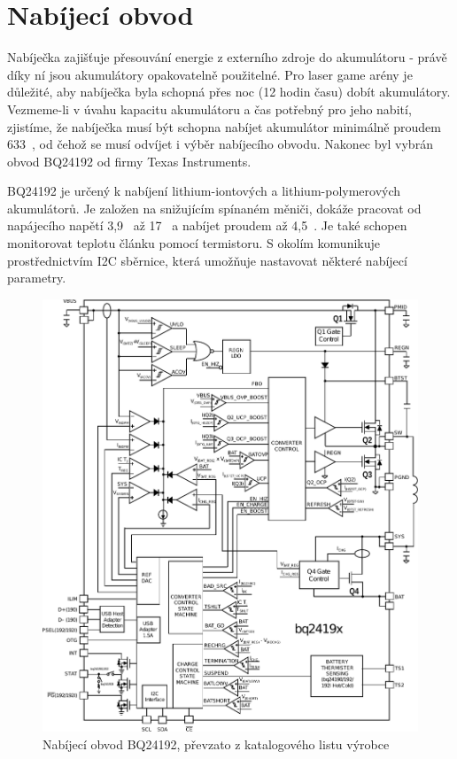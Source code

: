 \section{Nabíjecí obvod}
Nabíječka zajišťuje přesouvání energie z externího zdroje do akumulátoru - právě díky ní jsou akumulátory opakovatelně použitelné. Pro laser game arény je důležité, aby nabíječka byla schopná přes noc (12 hodin času) dobít akumulátory. Vezmeme-li v úvahu kapacitu akumulátoru a čas potřebný pro jeho nabití, zjistíme, že nabíječka musí být schopna nabíjet akumulátor minimálně proudem 633~, od čehož se musí odvíjet i výběr nabíjecího obvodu. Nakonec byl vybrán obvod BQ24192 od firmy Texas Instruments.

BQ24192 je určený k nabíjení lithium-iontových a lithium-polymerových akumulátorů. Je založen na snižujícím spínaném měniči, dokáže pracovat od napájecího napětí 3,9~ až 17~ a nabíjet proudem až 4,5~. Je také schopen monitorovat teplotu článku pomocí termistoru. S okolím komunikuje prostřednictvím I2C sběrnice, která umožňuje nastavovat některé nabíjecí parametry.

\begin{figure}[H]
    \begin{center}
        \includegraphics[width=\textwidth]{img/bq24192-block}
    \end{center}
    \caption{Nabíjecí obvod BQ24192, převzato z katalogového listu výrobce}
\end{figure}

